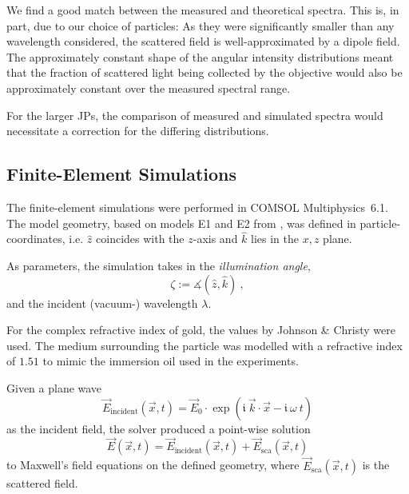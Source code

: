 \documentclass[10pt]{article}
\begin{document}
\begin{multicols}{2}
We find a good match between the measured and theoretical spectra. 
This is, in part, due to our choice of particles: 
As they were significantly smaller than any wavelength considered, the scattered field is well-approximated by a dipole field. 
The approximately constant shape of the angular intensity distributions meant that the fraction of scattered light being collected by the objective would also be approximately constant over the measured spectral range.

For the larger JPs, the comparison of measured and simulated spectra would necessitate a correction for the differing distributions. 


\subsection*{Finite-Element Simulations}

The finite-element simulations were performed in COMSOL \mbox{Multiphysics 6.1}. 
The model geometry, based on models E1 and E2 from \cite{BA}, was defined in particle-coordinates, i.e. $\hat{z}$ coincides with the $z$-axis and $\hat{k}$ lies in the $x,z$ plane. 

As parameters, the simulation takes in the \emph{illumination angle}, 
$$
    \zeta := \measuredangle\left( \hat{z}, \hat{k} \right) \ ,
$$
and the incident (vacuum-) wavelength $\lambda$. 

For the complex refractive index of gold, the values by Johnson \& Christy \cite{Johnson1972} were used. 
The medium surrounding the particle was modelled with a refractive index of $1.51$ to mimic the immersion oil used in the experiments. 

Given a plane wave 
$$
    \vec{E}_\mathrm{incident}(\vec{x},t) = \vec{E}_0 \cdot \exp\!\left( \mathfrak{i}\ \vec{k}\cdot\vec{x} - \mathfrak{i}\ \omega\ t \right)
$$
as the incident field, the solver produced a point-wise solution 
$$
    \vec{E}(\vec{x},t) = \vec{E}_\mathrm{incident}(\vec{x},t) + \vec{E}_\mathrm{sca}(\vec{x},t)
$$ 
to Maxwell's field equations on the defined geometry, where $\vec{E}_\mathrm{sca}(\vec{x},t)$ is the scattered field. 


\end{multicols}
\end{document}
